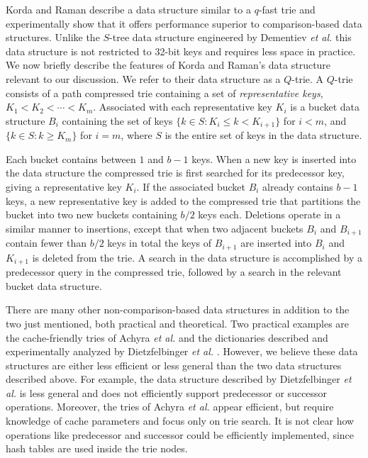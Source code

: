 \documentclass[]{acmtrans2m}
\begin{document}
Korda and Raman \citeyear{KordaRaman99} describe a data structure similar to a $q$-fast
trie \cite{Willard84} and experimentally show that it offers performance superior to comparison-based data structures.
Unlike the $S$-tree data structure engineered by Dementiev \textit{et al.} this data structure is not restricted to 
32-bit keys and requires less space in practice. We now briefly describe the features of Korda and Raman's data structure
relevant to our discussion. We refer to their data structure as a $Q$-trie.
A $Q$-trie consists of a path compressed trie containing a set of \textit{representative
keys}, $K_1 < K_2 < \cdots < K_m$. Associated with each representative key $K_i$ is a bucket data structure $B_i$
containing the set of keys $\lbrace k \in S : K_i \leq k < K_{i + 1} \rbrace$ for $i < m$, and
$\lbrace k \in S : k \geq K_m \rbrace$ for $i = m$, where $S$ is the entire set of keys in the data structure.

Each bucket contains between $1$ and $b - 1$ keys. When a new key is inserted into the data structure the compressed
trie is first searched for its predecessor key, giving a representative key $K_i$. If the associated bucket $B_i$ already
contains $b - 1$ keys, a new representative key is added to the compressed trie that partitions the bucket into
two new buckets containing $b/2$ keys each. Deletions operate in a similar manner to insertions, except that when two adjacent
buckets $B_i$ and $B_{i + 1}$ contain fewer than $b/2$ keys in total the keys of $B_{i + 1}$ are inserted
into $B_i$ and $K_{i + 1}$ is deleted from the trie. A search in the data structure is accomplished by a predecessor query in the 
compressed trie, followed by a search in the relevant bucket data structure.

There are many other non-comparison-based data structures in addition to the two just mentioned, both practical and theoretical. 
Two practical examples are the cache-friendly tries of Achyra \textit{et al.} \cite{Acharya+99} and the dictionaries described and experimentally
analyzed by Dietzfelbinger \textit{et al.} \citeyear{Dietzfelbinger+94,Dietzfelbinger+08}. However, we believe these
data structures are either less efficient or less general than the two data structures described above. 
For example, the data structure described by Dietzfelbinger \textit{et al.} is less general and does not efficiently support predecessor or successor
operations. Moreover, the tries of Achyra \textit{et al.} appear
efficient, but require knowledge of cache parameters and focus only on trie search. It is not clear how operations 
like predecessor and successor could be efficiently implemented, since hash tables are used inside the trie nodes.
\end{document}
